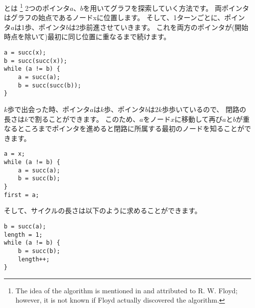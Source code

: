 
とは
\footnote{The idea of the algorithm is mentioned in \cite{knu982}
and attributed to R. W. Floyd; however, it is not known if Floyd actually
discovered the algorithm.}
2つのポインタ$a$、$b$を用いてグラフを探索していく方法です。
両ポインタはグラフの始点であるノードxに位置します。
そして、1ターンごとに、ポインタ$a$は1歩、ポインタ$b$は2歩前進させていきます。
これを両方のポインタが(開始時点を除いて)最初に同じ位置に重なるまで続けます。

\begin{lstlisting}
a = succ(x);
b = succ(succ(x));
while (a != b) {
    a = succ(a);
    b = succ(succ(b));
}
\end{lstlisting}


$k$歩で出会った時、ポインタ$a$は$k$歩、ポインタ$b$は$2k$歩歩いているので、
閉路の長さは$k$で割ることができます。
このため、$a$をノード$x$に移動して再び$a$と$b$が重なるところまでポインタを進めると閉路に所属する最初のノードを知ることができます。

\begin{lstlisting}
a = x;
while (a != b) {
    a = succ(a);
    b = succ(b);
}
first = a;
\end{lstlisting}

そして、サイクルの長さは以下のように求めることができます。
\begin{lstlisting}
b = succ(a);
length = 1;
while (a != b) {
    b = succ(b);
    length++;
}
\end{lstlisting}